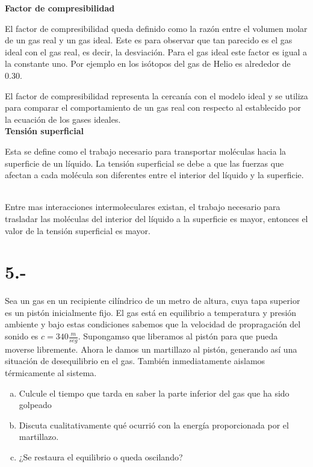 \documentclass{article}
\begin{document}
\begin{tcolorbox}[breakable]
    \textbf{Factor de compresibilidad}\
    
    El factor de compresibilidad queda definido como la razón entre el volumen molar de un gas real y un gas ideal. Este es para observar que tan parecido es el gas ideal con el gas real, es decir, la desviación. Para el gas ideal este factor es igual a la constante uno. Por ejemplo en los isótopos del gas de Helio es alrededor de 0.30. \
    
    El factor de compresibilidad representa la cercanía con el modelo ideal y se utiliza para comparar el comportamiento de un gas real con respecto al establecido por la ecuación de los gases ideales. \\ 
    
    \textbf{Tensión superficial}\
    
    Esta se define como el trabajo necesario para transportar moléculas hacia la superficie de un líquido. La tensión superficial se debe a que las fuerzas que afectan a cada molécula son diferentes entre el interior del líquido y la superficie. \ 
    
    Entre mas interacciones intermoleculares existan, el trabajo necesario para trasladar las moléculas del interior del líquido a la superficie es mayor, entonces el valor de la tensión superficial es mayor. \\ 
    
\end{tcolorbox}
\section*{5.-}
Sea un gas en un recipiente cilíndrico de un metro de altura, cuya tapa superior es 
un pistón inicialmente fijo. El gas está en equilibrio a temperatura y presión ambiente
y bajo estas condiciones sabemos que la velocidad de propragación del sonido es 
$c = 340 \frac{m}{seg}$. Supongamso que liberamos al pistón para que pueda moverse 
libremente. Ahora le damos un martillazo al pistón, generando así una situación de
desequilibrio en el gas. También inmediatamente aislamos térmicamente al sistema. 
\begin{enumerate}[a)]
    \item Culcule el tiempo que tarda en saber la parte inferior del gas que ha sido 
    golpeado 

    \item Discuta cualitativamente qué ocurrió con la energía proporcionada por el 
    martillazo. 

    \item ¿Se restaura el equilibrio o queda oscilando?
\end{enumerate}
\end{document}
